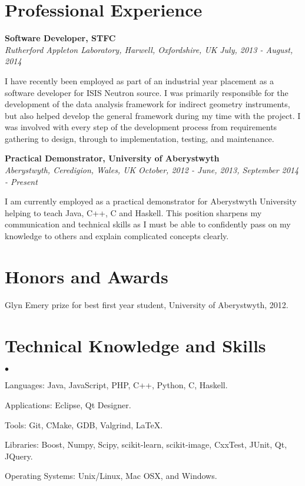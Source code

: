 \documentclass[margin,line]{res}
\newenvironment{list2}{
  \begin{list}{$\bullet$}{%
      \setlength{\itemsep}{0in}
      \setlength{\parsep}{0in} \setlength{\parskip}{0in}
      \setlength{\topsep}{0in} \setlength{\partopsep}{0in}
      \setlength{\leftmargin}{0.2in}}}{\end{list}}
\begin{document}
\begin{resume}
\section{\sc Professional Experience}
{\bf Software Developer, STFC} \\
{\it Rutherford Appleton Laboratory, Harwell, Oxfordshire, UK}  \hfill {\it July, 2013 - August, 2014}

I have recently been employed as part of an industrial year placement as a software developer for ISIS Neutron source. I was primarily responsible for the development of the data analysis framework for indirect geometry instruments, but also helped develop the general framework during my time with the project. I was involved with every step of the development process from requirements gathering to design, through to implementation, testing, and maintenance.

{\bf Practical Demonstrator, University of Aberystwyth} \\
{\it Aberystwyth, Ceredigion, Wales, UK} \hfill {\it  October, 2012 - June, 2013, September 2014 - Present}

I am currently employed as a practical demonstrator for Aberystwyth University helping to teach Java, C++, C and Haskell. This position sharpens my communication and technical skills as I must be able to confidently pass on my knowledge to others and explain complicated concepts clearly.

\section{\sc Honors and Awards}
Glyn Emery prize for best first year student, University of Aberystwyth, 2012.

\section{\sc Technical Knowledge and  Skills}
\begin{list2}
\item Languages: Java, JavaScript, PHP, C++, Python, C, Haskell.
\item Applications: Eclipse, Qt Designer.
\item Tools: Git, CMake, GDB, Valgrind, \LaTeX.
\item Libraries: Boost, Numpy, Scipy, scikit-learn, scikit-image, CxxTest, JUnit, Qt, JQuery.
\item Operating Systems:  Unix/Linux, Mac OSX, and Windows.\\
\end{list2}


\end{resume}
\end{document}
